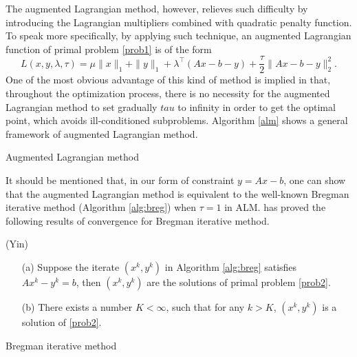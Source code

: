 \documentclass{article}
\begin{document}
The augmented Lagrangian method, however, relieves such difficulty by introducing the Lagrangian multipliers combined with quadratic penalty function. To speak more specifically, by applying such technique, an augmented Lagrangian function of primal problem \eqref{prob1} is of the form
\begin{equation}\label{al}
L(x,y,\lambda,\tau) = \mu\|x\|_1+\|y\|_1 +\lambda^\top(Ax-b-y) +\frac{\tau}{2}\|Ax-b-y\|_2^2.
\end{equation}
One of the most obvious advantage of this kind of method is implied in that, throughout the optimization process, there is no necessity for the augmented Lagrangian method to set gradually $tau$ to infinity in order to get the optimal point, which avoids ill-conditioned subproblems. Algorithm \ref{alm} shows a general framework of augmented Lagrangian method.
\begin{algorithm}[H]
	\caption{Augmented Lagrangian method}
	\begin{algorithmic}[1]\label{alm}
		\ENDWHILE
	\end{algorithmic}
\end{algorithm}
It should be mentioned that, in our form of constraint $y=Ax-b$, one can show that the augmented Lagrangian method is equivalent to the well-known Bregman iterative method (Algorithm \ref{alg:breg}) when $\tau=1$ in ALM. \cite{yin2008bregman} has proved the following results of convergence for Bregman iterative method.
\begin{theorem}
(Yin)
\begin{itemize}
	\item [(a)]Suppose the iterate $(x^k,y^k)$ in Algorithm \ref{alg:breg} satisfies $Ax^k-y^k=b$, then $(x^k,y^k)$ are the solutions of primal problem \eqref{prob2}.
	\item [(b)]There exists a number $K<\infty$, such that for any $k>K$, $(x^k,y^k)$ is a solution of \eqref{prob2}.
\end{itemize}
\end{theorem}
\begin{algorithm}[H]
\caption{Bregman iterative method}
\begin{algorithmic}[1]\label{alg:breg}
\ENDWHILE
{}
\end{algorithmic}
\end{algorithm}
\end{document}

